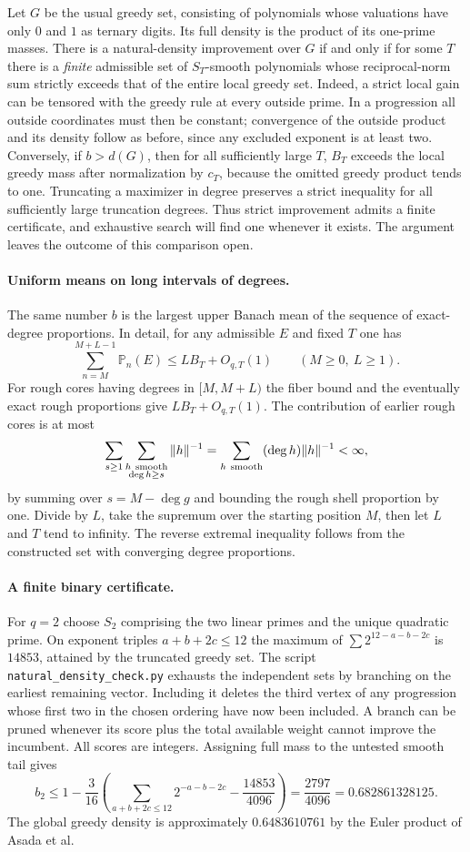 Let $G$ be the usual greedy set, consisting of polynomials whose valuations have only $0$ and $1$ as ternary digits. Its full density is the product of its one-prime masses. There is a natural-density improvement over $G$ if and only if for some $T$ there is a \emph{finite} admissible set of $S_T$-smooth polynomials whose reciprocal-norm sum strictly exceeds that of the entire local greedy set. Indeed, a strict local gain can be tensored with the greedy rule at every outside prime. In a progression all outside coordinates must then be constant; convergence of the outside product and its density follow as before, since any excluded exponent is at least two. Conversely, if $b>d(G)$, then for all sufficiently large $T$, $B_T$ exceeds the local greedy mass after normalization by $c_T$, because the omitted greedy product tends to one. Truncating a maximizer in degree preserves a strict inequality for all sufficiently large truncation degrees. Thus strict improvement admits a finite certificate, and exhaustive search will find one whenever it exists. The argument leaves the outcome of this comparison open.

\paragraph{Uniform means on long intervals of degrees.}
The same number $b$ is the largest upper Banach mean of the sequence of exact-degree proportions. In detail, for any admissible $E$ and fixed $T$ one has
\[
 \sum_{n=M}^{M+L-1}\mathbb P_n(E)\le LB_T+O_{q,T}(1)
 \qquad(M\ge0,\ L\ge1).
\]
For rough cores having degrees in $[M,M+L)$ the fiber bound and the eventually exact rough proportions give $LB_T+O_{q,T}(1)$. The contribution of earlier rough cores is at most
\[
 \sum_{s\ge1}\sum_{\substack{h\ {\rm smooth}\\\deg h\ge s}}\|h\|^{-1}
 =\sum_{h\ {\rm smooth}} (\deg h)\|h\|^{-1}<\infty ,
\]
by summing over $s=M-\deg g$ and bounding the rough shell proportion by one. Divide by $L$, take the supremum over the starting position $M$, then let $L$ and $T$ tend to infinity. The reverse extremal inequality follows from the constructed set with converging degree proportions.

\paragraph{A finite binary certificate.}
For $q=2$ choose $S_2$ comprising the two linear primes and the unique quadratic prime. On exponent triples $a+b+2c\le12$ the maximum of $\sum 2^{12-a-b-2c}$ is $14853$, attained by the truncated greedy set. The script \texttt{natural\_density\_check.py} exhausts the independent sets by branching on the earliest remaining vector. Including it deletes the third vertex of any progression whose first two in the chosen ordering have now been included. A branch can be pruned whenever its score plus the total available weight cannot improve the incumbent. All scores are integers. Assigning full mass to the untested smooth tail gives
\[
 b_2\le 1-\frac3{16}\left(\sum_{a+b+2c\le12}2^{-a-b-2c}
                   -\frac{14853}{4096}\right)
 =\frac{2797}{4096}=0.682861328125.
\]
The global greedy density is approximately $0.6483610761$ by the Euler product of Asada et al.
